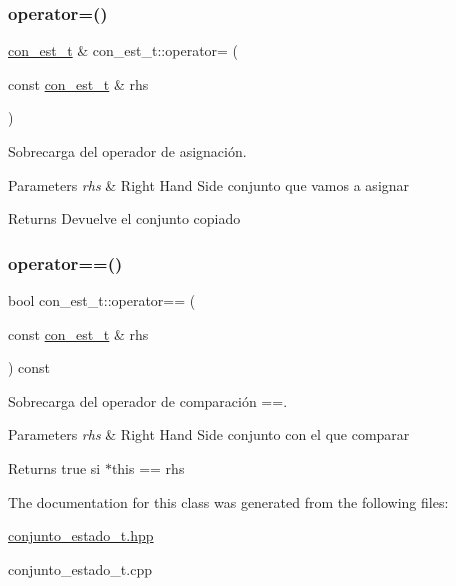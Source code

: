 \subsubsection{\texorpdfstring{operator=()}{operator=()}}
{\footnotesize\ttfamily \hyperlink{classcon__est__t}{con\+\_\+est\+\_\+t} \& con\+\_\+est\+\_\+t\+::operator= (\begin{DoxyParamCaption}\item[{const \hyperlink{classcon__est__t}{con\+\_\+est\+\_\+t} \&}]{rhs }\end{DoxyParamCaption})}



Sobrecarga del operador de asignación. 


\begin{DoxyParams}{Parameters}
{\em rhs} & Right Hand Side conjunto que vamos a asignar \\
\hline
\end{DoxyParams}
\begin{DoxyReturn}{Returns}
Devuelve el conjunto copiado 
\end{DoxyReturn}
\mbox{\label{classcon__est__t_a1ff2060fab48cff33abe98f57b6bfd58}} 
\subsubsection{\texorpdfstring{operator==()}{operator==()}}
{\footnotesize\ttfamily bool con\+\_\+est\+\_\+t\+::operator== (\begin{DoxyParamCaption}\item[{const \hyperlink{classcon__est__t}{con\+\_\+est\+\_\+t} \&}]{rhs }\end{DoxyParamCaption}) const\hspace{0.3cm}{\ttfamily [inline]}}



Sobrecarga del operador de comparación ==. 


\begin{DoxyParams}{Parameters}
{\em rhs} & Right Hand Side conjunto con el que comparar \\
\hline
\end{DoxyParams}
\begin{DoxyReturn}{Returns}
true si $\ast$this == rhs 
\end{DoxyReturn}


The documentation for this class was generated from the following files\+:\begin{DoxyCompactItemize}
\item 
\hyperlink{conjunto__estado__t_8hpp}{conjunto\+\_\+estado\+\_\+t.\+hpp}\item 
conjunto\+\_\+estado\+\_\+t.\+cpp\end{DoxyCompactItemize}
